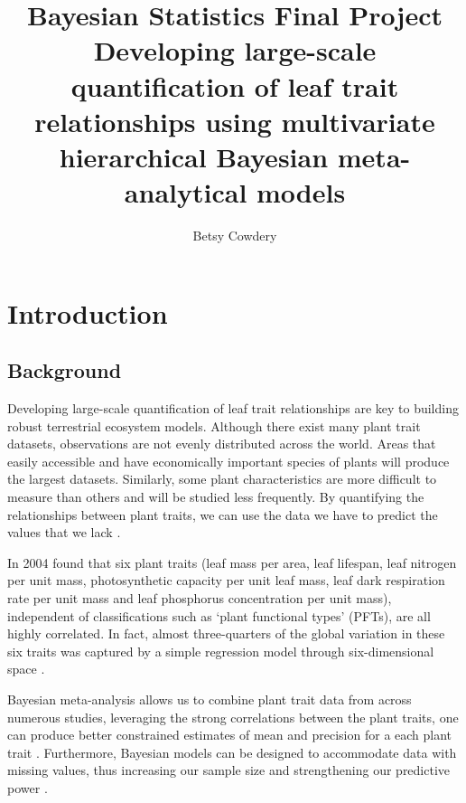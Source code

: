 \documentclass[11pt]{article}
\theoremstyle{definition}
\theoremstyle{remark}
\theoremstyle{definition}
\begin{document}
\author{Betsy Cowdery}
\title{Bayesian Statistics Final Project\\
Developing large-scale quantification of leaf trait relationships using multivariate hierarchical Bayesian meta-analytical models}
\date{}
\maketitle

\section{Introduction}
\subsection{Background}

Developing large-scale quantification of leaf trait relationships are key to building robust terrestrial ecosystem models. Although there exist many  plant trait datasets, observations are not evenly distributed across the world. Areas that easily accessible and have economically important species of plants will produce the largest datasets. Similarly, some plant characteristics are more difficult to measure than others and will be studied less frequently. By quantifying the relationships between plant traits, we can use the data we have to predict the values that we lack \citep{Wright,Reich2007}. 

In 2004 \citep{Wright} found that six plant traits (leaf mass per area, leaf lifespan, leaf nitrogen per unit mass, photosynthetic capacity per unit leaf mass, leaf dark respiration rate per unit mass  and leaf phosphorus concentration per unit mass), independent of classifications such as ‘plant functional types’ (PFTs), are all highly correlated. In fact, almost three-quarters of the global variation in these six traits was captured by a simple regression model through six-dimensional space \citep{Wright2005}. 

Bayesian meta-analysis allows us to combine plant trait data from across numerous studies, leveraging the strong correlations between the plant traits, one can produce better constrained estimates of mean and precision for a each plant trait \citep{Dietze2014} . Furthermore, Bayesian models can be designed to accommodate data with missing values, thus increasing our sample size and strengthening our predictive power \citep{Clark2007}.
\end{document}
